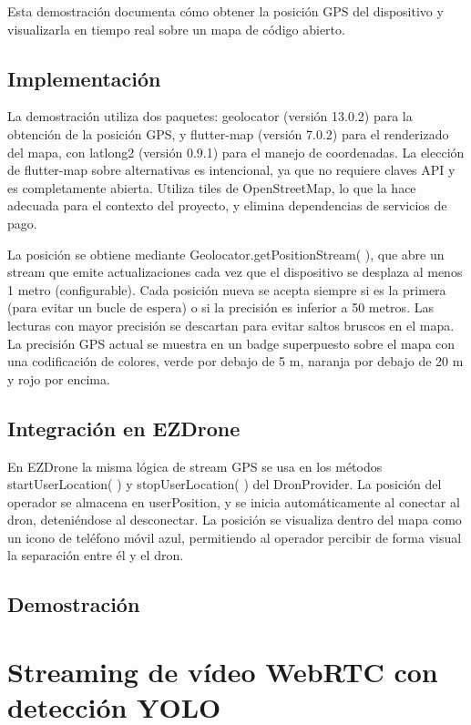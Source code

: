 Esta demostración documenta cómo obtener la posición GPS del dispositivo y visualizarla en tiempo real sobre un mapa de código abierto.

\subsection{Implementación}
La demostración utiliza dos paquetes: geolocator (versión 13.0.2) para la obtención de la posición GPS, y flutter-map (versión 7.0.2) para el renderizado del mapa, con latlong2 (versión 0.9.1) para el manejo de coordenadas. La elección de flutter-map sobre alternativas es intencional, ya que no requiere claves API y es completamente abierta. Utiliza tiles de OpenStreetMap, lo que la hace adecuada para el contexto del proyecto, y elimina dependencias de servicios de pago.

La posición se obtiene mediante Geolocator.getPositionStream( ), que abre un stream que emite actualizaciones cada vez que el dispositivo se desplaza al menos 1 metro (configurable). Cada posición nueva se acepta siempre si es la primera (para evitar un bucle de espera) o si la precisión es inferior a 50 metros. Las lecturas con mayor precisión se descartan para evitar saltos bruscos en el mapa. 
La precisión GPS actual se muestra en un badge superpuesto sobre el mapa con una codificación de colores, verde por debajo de 5 m, naranja por debajo de 20 m y rojo por encima.

\subsection{Integración en EZDrone}
En EZDrone la misma lógica de stream GPS se usa en los métodos startUserLocation( ) y stopUserLocation( ) del DronProvider. La posición del operador se almacena en userPosition, y se inicia automáticamente al conectar al dron, deteniéndose al desconectar. La posición se visualiza dentro del mapa como un icono de teléfono móvil azul, permitiendo al operador percibir de forma visual la separación entre él y el dron.

\subsection{Demostración}

\section{Streaming de vídeo WebRTC con detección YOLO}


